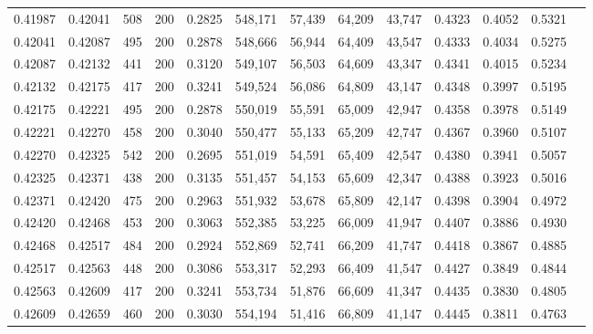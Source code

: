 \begin{tabular}{rrrrrrrrrrrrr}
0.41987 & 0.42041 &    508 & 200 &                                     0.2825 & 548,171 &  57,439 &  64,209 &  43,747 & 0.4323 & 0.4052 & 0.5321 \\
0.42041 & 0.42087 &    495 & 200 &                                     0.2878 & 548,666 &  56,944 &  64,409 &  43,547 & 0.4333 & 0.4034 & 0.5275 \\
0.42087 & 0.42132 &    441 & 200 &                                     0.3120 & 549,107 &  56,503 &  64,609 &  43,347 & 0.4341 & 0.4015 & 0.5234 \\
0.42132 & 0.42175 &    417 & 200 &                                     0.3241 & 549,524 &  56,086 &  64,809 &  43,147 & 0.4348 & 0.3997 & 0.5195 \\
0.42175 & 0.42221 &    495 & 200 &                                     0.2878 & 550,019 &  55,591 &  65,009 &  42,947 & 0.4358 & 0.3978 & 0.5149 \\
0.42221 & 0.42270 &    458 & 200 &                                     0.3040 & 550,477 &  55,133 &  65,209 &  42,747 & 0.4367 & 0.3960 & 0.5107 \\
0.42270 & 0.42325 &    542 & 200 &                                     0.2695 & 551,019 &  54,591 &  65,409 &  42,547 & 0.4380 & 0.3941 & 0.5057 \\
0.42325 & 0.42371 &    438 & 200 &                                     0.3135 & 551,457 &  54,153 &  65,609 &  42,347 & 0.4388 & 0.3923 & 0.5016 \\
0.42371 & 0.42420 &    475 & 200 &                                     0.2963 & 551,932 &  53,678 &  65,809 &  42,147 & 0.4398 & 0.3904 & 0.4972 \\
0.42420 & 0.42468 &    453 & 200 &                                     0.3063 & 552,385 &  53,225 &  66,009 &  41,947 & 0.4407 & 0.3886 & 0.4930 \\
0.42468 & 0.42517 &    484 & 200 &                                     0.2924 & 552,869 &  52,741 &  66,209 &  41,747 & 0.4418 & 0.3867 & 0.4885 \\
0.42517 & 0.42563 &    448 & 200 &                                     0.3086 & 553,317 &  52,293 &  66,409 &  41,547 & 0.4427 & 0.3849 & 0.4844 \\
0.42563 & 0.42609 &    417 & 200 &                                     0.3241 & 553,734 &  51,876 &  66,609 &  41,347 & 0.4435 & 0.3830 & 0.4805 \\
0.42609 & 0.42659 &    460 & 200 &                                     0.3030 & 554,194 &  51,416 &  66,809 &  41,147 & 0.4445 & 0.3811 & 0.4763 \\

\end{tabular}
